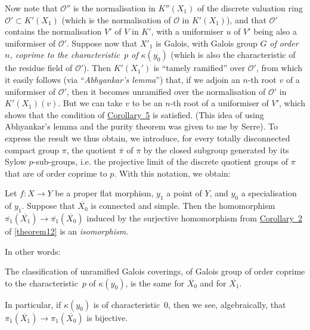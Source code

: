 \documentclass{article}
\theoremstyle{plain}
\newenvironment{theorem}[1]
  {\renewcommand\theinnercustomtheorem{#1}\innercustomtheorem}
  {\endinnercustomtheorem}
\newenvironment{corollary}[1]
  {\renewcommand\theinnercustomcorollary{#1}\innercustomcorollary}
  {\endinnercustomcorollary}
\theoremstyle{definition}
\newcommand{\sh}{\mathscr}
\newcommand{\kres}{\kappa}
\newcommand{\oldpage}[1]{\marginpar{\footnotesize$\Big\vert$ \textit{p.~#1}}}
\begin{document}
Now note that $\sh{O}''$ is the normalisation in $K''(X_1)$ of the discrete valuation ring $\sh{O}'\subset K'(X_1)$ (which is the normalisation of $\sh{O}$ in $K'(X_1)$), and that $\sh{O}'$ contains the normalisation $V'$ of $V$ in $K'$, with a uniformiser $u$ of $V'$ being also a uniformiser of $\sh{O}'$.
Suppose now that $X'_1$ is Galois, with Galois group $G$ \emph{of order $n$, coprime to the characteristic~$p$ of $\kres(y_0)$} (which is also the characteristic of the residue field of $\sh{O}'$).
Then $K'(X_1')$ is ``tamely ramified'' over $\sh{O}'$, from which it easily follows (via ``\emph{Abhyankar's lemma}'') that, if we adjoin an $n$-th root $v$ of a uniformiser of $\sh{O}'$, then it becomes unramified over the normalisation of $\sh{O}'$ in $K'(X_1)(v)$.
But we can take $v$ to be an $n$-th root of a uniformiser of $V'$, which shows that the condition of \hyperref[theorem12corollary5]{Corollary~5} is satisfied.
(This idea of using Abhyankar's lemma and the purity theorem was given to me by Serre).
To express the result we thus obtain, we introduce, for every totally disconnected compact group $\pi$, the quotient $\overline{\pi}$ of $\pi$ by the closed subgroup generated by its Sylow $p$-sub-groups, i.e. the projective limit of the discrete quotient groups of $\pi$ that are of order coprime to $p$.
With this notation, we obtain:

\begin{theorem}{13}
\label{theorem13}
  Let $f\colon X\to Y$ be a proper flat morphism, $y_1$ a point of $Y$, and $y_0$ a specialisation of $y_1$.
  Suppose that $\overline{X_0}$ is connected and simple.
  Then the homomorphism $\overline{\pi_1}(\overline{X_1})\to\overline{\pi_1}(\overline{X_0})$ induced by the
\oldpage{182-27}
  surjective homomorphism from \hyperref[theorem12corollary2]{Corollary~2} of \cref{theorem12} is an \emph{isomorphism}.
\end{theorem}

In other words:

\begin{corollary}{1}
\label{theorem13corollary1}
  The classification of unramified Galois coverings, of Galois group of order coprime to the characteristic~$p$ of $\kres(y_0)$, is the same for $\overline{X_0}$ and for $\overline{X_1}$.
\end{corollary}

In particular, if $\kres(y_0)$ is of characteristic~$0$, then we see, algebraically, that $\pi_1(\overline{X_1})\to\pi_1(\overline{X_0})$ is bijective.
\end{document}
